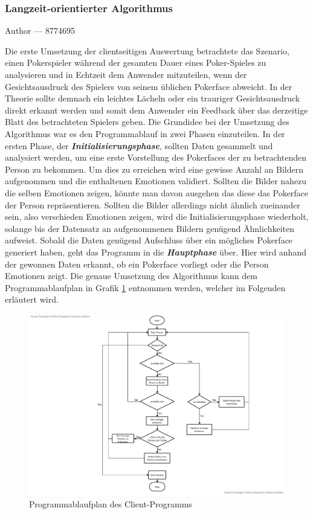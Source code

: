 \documentclass[12pt, a4paper]{report}
\makeatletter
\newcommand{\sectionauthor}[1]{%
  {\parindent0pt\vspace*{-5pt}%
  \large{Author --- }
  \linespread{1.1}\large\scshape#1%
  \par\nobreak\vspace*{35pt} }
  \@afterheading%
}
\makeatother
\begin{document}
\subsubsection{Langzeit-orientierter Algorithmus}
\sectionauthor{8774695}
Die erste Umsetzung der clientseitigen Auswertung betrachtete das Szenario, einen Pokerspieler während der gesamten Dauer eines Poker-Spieles zu analysieren und in Echtzeit dem Anwender mitzuteilen, wenn der Gesichtsausdruck des Spielers von seinem üblichen Pokerface abweicht. In der Theorie sollte demnach ein leichtes Lächeln oder ein trauriger Gesichtsausdruck direkt erkannt werden und somit dem Anwender ein Feedback über das derzeitige Blatt des betrachteten Spielers geben.
Die Grundidee bei der Umsetzung des Algorithmus war es den Programmablauf in zwei Phasen einzuteilen. In der ersten Phase, der  \textit{\textbf{Initialisierungsphase}}, sollten Daten gesammelt und analysiert werden, um eine erste Vorstellung des Pokerfaces der zu betrachtenden Person zu bekommen. Um dies zu erreichen wird eine gewisse Anzahl an Bildern aufgenommen und die enthaltenen Emotionen validiert. Sollten die Bilder nahezu die selben Emotionen zeigen, könnte man davon ausgehen das diese das Pokerface der Person repräsentieren. Sollten die Bilder allerdings nicht ähnlich zueinander sein, also verschieden Emotionen zeigen, wird die Initialisierungsphase wiederholt, solange bis der Datensatz an aufgenommenen Bildern genügend Ähnlichkeiten aufweist. Sobald die Daten genügend Aufschluss über ein mögliches Pokerface generiert haben, geht das Programm in die  \textit{\textbf{Hauptphase}} über. Hier wird anhand der gewonnen Daten erkannt, ob ein Pokerface vorliegt oder die Person Emotionen zeigt. Die genaue Umsetzung des Algorithmus kann dem Programmablaufplan in Grafik \ref{fig:flowchart} entnommen werden, welcher im Folgenden erläutert wird.

\begin{figure}[H]
\includegraphics[width=\linewidth]{Bilder/ClientDataflow.pdf}
\caption{Programmablaufplan des Client-Programms}
\label{fig:flowchart}
\end{figure}
\end{document}
